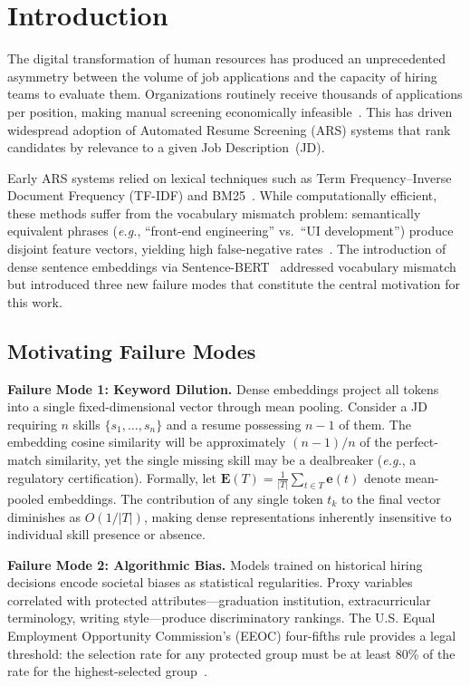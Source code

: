 \documentclass{llncs}
\begin{document}
\section{Introduction}

The digital transformation of human resources has produced an unprecedented asymmetry between the volume of job applications and the capacity of hiring teams to evaluate them. Organizations routinely receive thousands of applications per position, making manual screening economically infeasible~\cite{chen2023automated,kessler2018algorithm}. This has driven widespread adoption of Automated Resume Screening (ARS) systems that rank candidates by relevance to a given Job Description~(JD).

Early ARS systems relied on lexical techniques such as Term Frequency--Inverse Document Frequency (TF-IDF) and BM25~\cite{robertson2009probabilistic}. While computationally efficient, these methods suffer from the vocabulary mismatch problem: semantically equivalent phrases (\textit{e.g.}, ``front-end engineering'' vs.\ ``UI development'') produce disjoint feature vectors, yielding high false-negative rates~\cite{singh2020automated}. The introduction of dense sentence embeddings via Sentence-BERT~\cite{reimers2019sbert} addressed vocabulary mismatch but introduced three new failure modes that constitute the central motivation for this work.

\subsection{Motivating Failure Modes}

\textbf{Failure Mode 1: Keyword Dilution.} Dense embeddings project all tokens into a single fixed-dimensional vector through mean pooling. Consider a JD requiring $n$ skills $\{s_1, \ldots, s_n\}$ and a resume possessing $n{-}1$ of them. The embedding cosine similarity will be approximately $(n{-}1)/n$ of the perfect-match similarity, yet the single missing skill may be a dealbreaker (\textit{e.g.}, a regulatory certification). Formally, let $\mathbf{E}(T) = \frac{1}{|T|}\sum_{t \in T} \mathbf{e}(t)$ denote mean-pooled embeddings. The contribution of any single token $t_k$ to the final vector diminishes as $O(1/|T|)$, making dense representations inherently insensitive to individual skill presence or absence.

\textbf{Failure Mode 2: Algorithmic Bias.} Models trained on historical hiring decisions encode societal biases as statistical regularities. Proxy variables correlated with protected attributes---graduation institution, extracurricular terminology, writing style---produce discriminatory rankings. The U.S. Equal Employment Opportunity Commission's (EEOC) four-fifths rule provides a legal threshold: the selection rate for any protected group must be at least 80\% of the rate for the highest-selected group~\cite{dwork2012fairness,buolamwini2018gender}.
\end{document}
